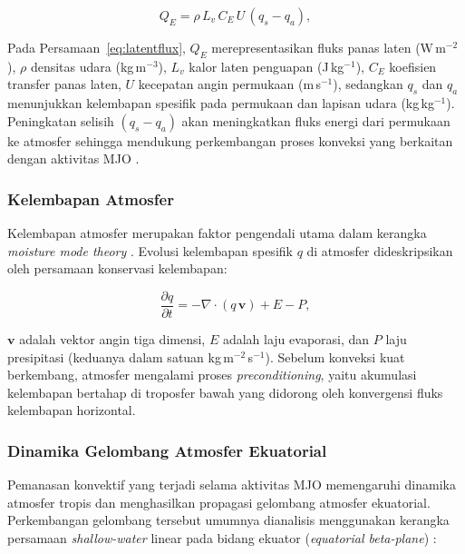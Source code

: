 \documentclass[12pt,a4paper]{report}
\begin{document}
\begin{equation}
  Q_E = \rho\, L_v\, C_E\, U\, (q_s - q_a),
  \label{eq:latentflux}
\end{equation}

\noindent
Pada Persamaan~\ref{eq:latentflux}, $Q_E$ merepresentasikan fluks panas laten
(W\,m$^{-2}$), $\rho$ densitas udara (kg\,m$^{-3}$), $L_v$ kalor laten
penguapan (J\,kg$^{-1}$), $C_E$ koefisien transfer panas laten, $U$
kecepatan angin permukaan (m\,s$^{-1}$), sedangkan $q_s$ dan $q_a$ menunjukkan kelembapan spesifik pada permukaan dan lapisan
udara (kg\,kg$^{-1}$). Peningkatan selisih $(q_s - q_a)$ akan
meningkatkan fluks energi dari permukaan ke atmosfer sehingga mendukung
perkembangan proses konveksi yang berkaitan dengan aktivitas MJO
\cite{sobel2010}.
 
\subsubsection{Kelembapan Atmosfer}
 
Kelembapan atmosfer merupakan faktor pengendali utama dalam kerangka
\textit{moisture mode theory} \cite{sobel2013, raymond2009}. Evolusi
kelembapan spesifik $q$ di atmosfer dideskripsikan oleh persamaan
konservasi kelembapan:
 
\begin{equation}
  \frac{\partial q}{\partial t}
  = -\nabla \cdot (q\,\mathbf{v}) + E - P,
  \label{eq:moisture}
\end{equation}
 
\noindent
$\mathbf{v}$ adalah vektor angin tiga dimensi, $E$ adalah laju
evaporasi, dan $P$ laju presipitasi (keduanya dalam satuan
kg\,m$^{-2}$\,s$^{-1}$). Sebelum konveksi kuat berkembang, atmosfer
mengalami proses \textit{preconditioning}, yaitu akumulasi kelembapan
bertahap di troposfer bawah yang didorong oleh konvergensi fluks kelembapan
horizontal.
 
\subsubsection{Dinamika Gelombang Atmosfer Ekuatorial}
 
Pemanasan konvektif yang terjadi selama aktivitas MJO memengaruhi dinamika atmosfer tropis dan menghasilkan propagasi gelombang atmosfer ekuatorial. Perkembangan gelombang tersebut umumnya dianalisis menggunakan kerangka persamaan \textit{shallow-water} linear pada bidang ekuator (\textit{equatorial beta-plane}) \cite{matsuno1966}:
 
\end{document}
